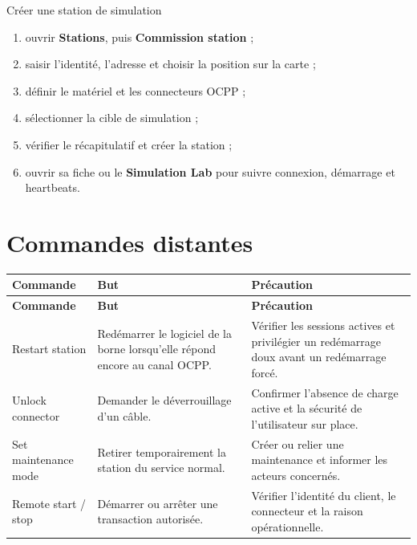 \begin{procedurebox}{Créer une station de simulation}
  \begin{enumerate}[leftmargin=1.6em]
    \item ouvrir \textbf{Stations}, puis \textbf{Commission station} ;
    \item saisir l'identité, l'adresse et choisir la position sur la carte ;
    \item définir le matériel et les connecteurs OCPP ;
    \item sélectionner la cible de simulation ;
    \item vérifier le récapitulatif et créer la station ;
    \item ouvrir sa fiche ou le \textbf{Simulation Lab} pour suivre connexion,
    démarrage et heartbeats.
  \end{enumerate}
\end{procedurebox}


\section{Commandes distantes}

\begin{longtable}{|L{3.4cm}|L{5.1cm}|L{7cm}|}
  \hline
  \textbf{Commande} & \textbf{But} & \textbf{Précaution} \\ \hline
  \endfirsthead
  \hline
  \textbf{Commande} & \textbf{But} & \textbf{Précaution} \\ \hline
  \endhead
  Restart station & Redémarrer le logiciel de la borne lorsqu'elle répond encore
  au canal OCPP. & Vérifier les sessions actives et privilégier un redémarrage
  doux avant un redémarrage forcé. \\ \hline
  Unlock connector & Demander le déverrouillage d'un câble. & Confirmer l'absence
  de charge active et la sécurité de l'utilisateur sur place. \\ \hline
  Set maintenance mode & Retirer temporairement la station du service normal. &
  Créer ou relier une maintenance et informer les acteurs concernés. \\ \hline
  Remote start / stop & Démarrer ou arrêter une transaction autorisée. & Vérifier
  l'identité du client, le connecteur et la raison opérationnelle. \\ \hline
\end{longtable}

